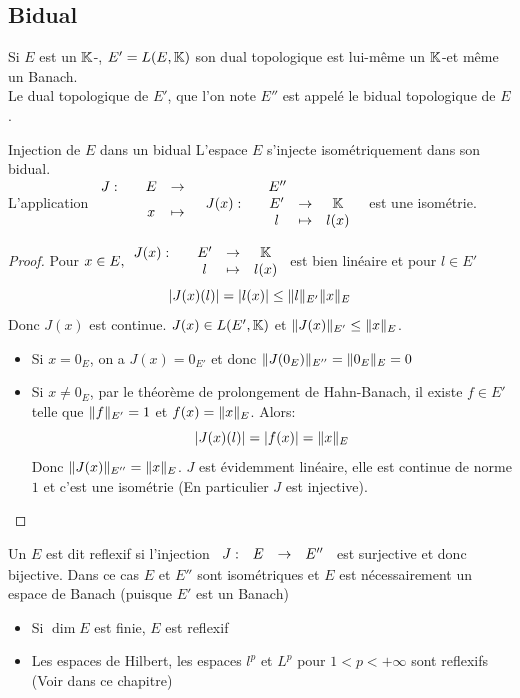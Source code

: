 \documentclass[]{report}
\begin{document}
    \subsection*{Bidual}

    Si $E$ est un $\mathbb{K}$-\evn, $E'=L(E,\mathbb{K})$ son dual topologique est lui-même un $\mathbb{K}$-\evn et même un Banach.\\
    Le dual topologique de $E'$, que l'on note $E''$ est appelé le bidual topologique de $E$.

    \begin{cor}{Injection de $E$ dans un bidual}{}
        L'espace $E$ s'injecte isométriquement dans son bidual.\\
        L'application $\begin{array}{ccccc} J : & & E & \to & E'' \\ & & x & \mapsto & \begin{array}{ccccc} J(x) : & & E' & \to & \mathbb{K} \\ & & l & \mapsto & l(x) \end{array} \end{array}$ est une isométrie.
    \end{cor}

    \begin{proof}
        Pour $x\in E, \begin{array}{ccccc} J(x) : & & E' & \to & \mathbb{K} \\ & & l & \mapsto & l(x) \end{array}$ est bien linéaire et pour $l\in E'$
        \[\left|J(x)(l)\right|=\left|l(x)\right|\le \lVert l \rVert_{E'}\lVert x \rVert_E\]
        Donc $J(x)$ est continue. $J(x)\in L(E',\mathbb{K})$ et $\lVert J(x) \rVert_{E'}\le \lVert x \rVert_{E}$.
        \begin{itemize}
            \item Si $x=0_E$, on a $J(x)=0_{E'}$ et donc $\lVert J(0_E) \rVert_{E''}=\lVert 0_E \rVert_E=0$
            \item Si $x\neq 0_E$, par le théorème de prolongement de Hahn-Banach, il existe $f\in E'$ telle que $\lVert f \rVert_{E'}=1$ et $f(x)=\lVert x \rVert_E$. Alors:
            \[\left|J(x)(l)\right|=\left|f(x)\right|=\lVert x \rVert_E\]
            Donc $\lVert J(x) \rVert_{E''}=\lVert x \rVert_E$. $J$ est évidemment linéaire, elle est continue de norme $1$ et c'est une isométrie (En particulier $J$ est injective).
        \end{itemize}
    \end{proof}

    \begin{df}{}{}
        Un \evn $E$ est dit reflexif si l'injection $\begin{array}{ccccc} J : & E & \to & E'' \end{array}$ est surjective et donc bijective. Dans ce cas $E$ et $E''$ sont isométriques et $E$ est nécessairement un espace de Banach (puisque $E'$ est un Banach)
    \end{df}

    \begin{ex}{}{}
        \begin{itemize}
            \item Si $\dim E$ est finie, $E$ est reflexif
            \item Les espaces de Hilbert, les espaces $l^p$ et $L^p$ pour $1<p<+\infty$ sont reflexifs (Voir dans ce chapitre)
        \end{itemize}
    \end{ex}
\end{document}
